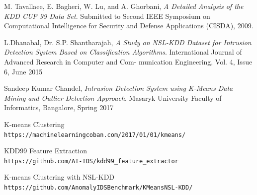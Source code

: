 \documentclass[12pt,twoside]{report}
\begin{document}
\newpage
\begin{thebibliography}{9}
	M. Tavallaee, E. Bagheri, W. Lu, and A. Ghorbani,
	\textit{A Detailed Analysis of the KDD CUP 99 Data Set}.
	Submitted to Second IEEE Symposium on Computational Intelligence for Security and Defense Applications (CISDA), 2009.

	L.Dhanabal, Dr. S.P. Shantharajah,
	\textit{A Study on NSL-KDD Dataset for Intrusion Detection System Based on Classification Algorithms}.
	International Journal of Advanced Research in Computer and Com-
	munication Engineering, Vol. 4, Issue 6, June 2015

	Sandeep Kumar Chandel,
	\textit{Intrusion Detection System
		using K-Means Data Mining
		and Outlier Detection
		Approach}.
	Masaryk University Faculty of Informatics, Bangalore, Spring 2017

	K-means Clustering
	\\\texttt{https://machinelearningcoban.com/2017/01/01/kmeans/}

	KDD99 Feature Extraction
	\\\texttt{https://github.com/AI-IDS/kdd99\_feature\_extractor}

	K-means Clustering with NSL-KDD
	\\\texttt{https://github.com/AnomalyIDSBenchmark/KMeansNSL-KDD/}

\end{thebibliography}
\end{document}
